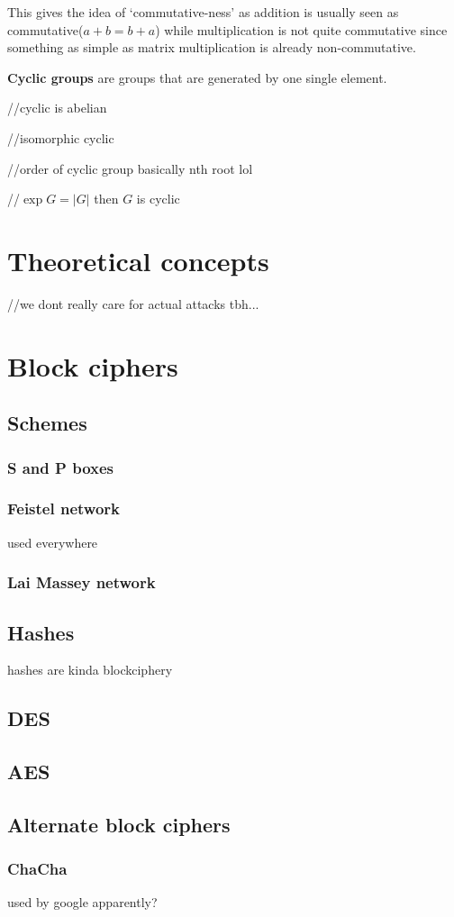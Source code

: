 \documentclass{report}
\begin{document}
This gives the idea of `commutative-ness' as addition is usually seen as commutative($a+b=b+a$) while multiplication is not quite commutative since something as simple as matrix multiplication is already non-commutative.

\textbf{Cyclic groups} are groups that are generated by one single element. 

//cyclic is abelian

//isomorphic cyclic

//order of cyclic group basically nth root lol

//$\exp G=|G|$ then $G$ is cyclic

\part{Theoretical concepts}
//we dont really care for actual attacks tbh...
\part{Block ciphers}
\chapter{Schemes}
\section{S and P boxes}
\section{Feistel network}
used everywhere
\section{Lai Massey network}
\chapter{Hashes}
hashes are kinda blockciphery
\chapter{DES}
\chapter{AES}
\chapter{Alternate block ciphers}
\section{ChaCha}
used by google apparently?
\end{document}
